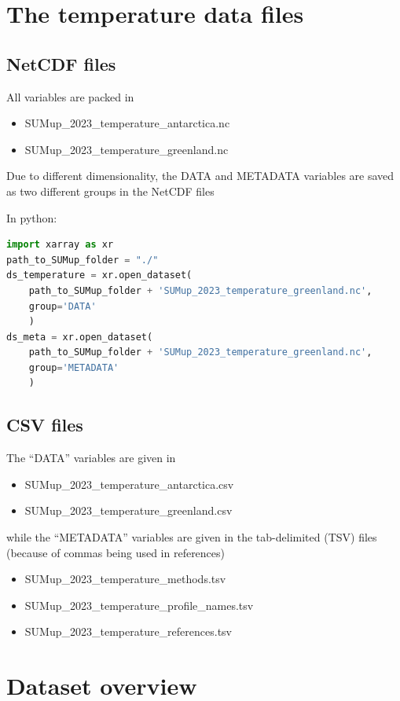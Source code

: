 \documentclass[journal abbreviation, manuscript]{copernicus}
\begin{document}


\section{The temperature data files}
\subsection{NetCDF files}

All variables are packed in 
\begin{itemize}
\item SUMup\_2023\_temperature\_antarctica.nc
\item SUMup\_2023\_temperature\_greenland.nc
\end{itemize}
Due to different dimensionality, the DATA and METADATA variables are saved as two different groups in the NetCDF files

In python:
\begin{lstlisting}[language=python]
import xarray as xr
path_to_SUMup_folder = "./"
ds_temperature = xr.open_dataset(
    path_to_SUMup_folder + 'SUMup_2023_temperature_greenland.nc', 
    group='DATA'
    )
ds_meta = xr.open_dataset(
    path_to_SUMup_folder + 'SUMup_2023_temperature_greenland.nc',
    group='METADATA'
    )
\end{lstlisting} 

\subsection{CSV files}
The “DATA” variables are given in 
\begin{itemize}
\item SUMup\_2023\_temperature\_antarctica.csv 
\item SUMup\_2023\_temperature\_greenland.csv 
\end{itemize}
while the “METADATA” variables are given in the tab-delimited (TSV) files (because of commas being used in references)
\begin{itemize}
\item SUMup\_2023\_temperature\_methods.tsv
\item SUMup\_2023\_temperature\_profile\_names.tsv
\item SUMup\_2023\_temperature\_references.tsv
\end{itemize}



\section{Dataset overview}
\end{document}
